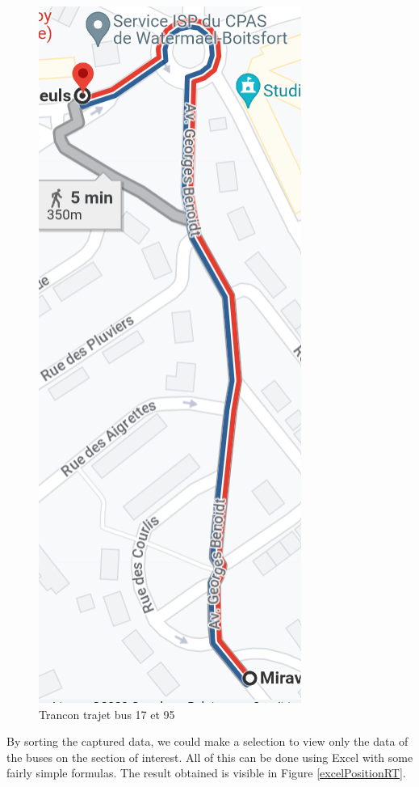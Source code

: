 \documentclass[12pt]{report}
\begin{document}
	\begin{center}
		\begin{figure}
			\centering
			\includegraphics{images/trancon17.png}
			\caption{Trancon trajet bus 17 et 95}
			\label{Trancon17}
		\end{figure}
	\end{center}
	
	By sorting the captured data, we could make a selection to view only the data of the buses on the section of interest. All of this can be done using Excel with some fairly simple formulas. The result obtained is visible in Figure \ref{excelPositionRT}.
	
\end{document}

